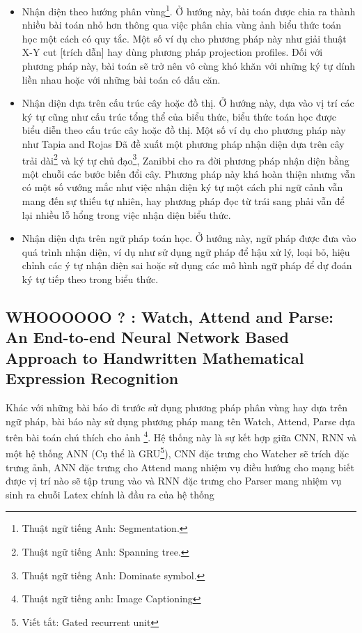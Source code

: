 \documentclass[a4paper,12pt]{article}
\begin{document}
	\begin{itemize}
		\item Nhận diện theo hướng phân vùng\footnote{Thuật ngữ tiếng Anh: Segmentation.}. Ở hướng này, bài toán được chia ra thành nhiều bài toán nhỏ hơn thông qua việc phân chia vùng ảnh biểu thức toán học một cách có quy tắc. Một số ví dụ cho phương pháp này như giải thuật X-Y cut [trích dẫn] hay dùng phương pháp projection profiles. Đối với phương pháp này, bài toán sẽ trở nên vô cùng khó khăn với những ký tự dính liền nhau hoặc với những bài toán có dấu căn.
		
		\item Nhận diện dựa trên cấu trúc cây hoặc đồ thị. Ở hướng này, dựa vào vị trí các ký tự cũng như cấu trúc tổng thể của biểu thức, biểu thức toán học được biểu diễn theo cấu trúc cây hoặc đồ thị. Một số ví dụ cho phương pháp này như Tapia and Rojas Đã đề xuất một phương pháp nhận diện dựa trên cây trải dài\footnote{Thuật ngữ tiếng Anh: Spanning tree.} và ký tự chủ đạo\footnote{Thuật ngữ tiếng Anh: Dominate symbol.}, Zanibbi cho ra đời phương pháp nhận diện bằng một chuỗi các bước biến đổi cây. Phương pháp này khá hoàn thiện nhưng vẫn có một số vướng mắc như việc nhận diện ký tự một cách phi ngữ cảnh vẫn mang đến sự thiếu tự nhiên, hay phương pháp đọc từ trái sang phải vẫn để lại nhiều lỗ hổng trong việc nhận diện biểu thức.
		
		\item Nhận diện dựa trên ngữ pháp toán học. Ở hướng này, ngữ pháp được đưa vào quá trình nhận diện, ví dụ như sử dụng ngữ pháp để hậu xử lý, loại bỏ, hiệu chỉnh các ý tự nhận diện sai hoặc sử dụng các mô hình ngữ pháp để dự đoán ký tự tiếp theo trong biểu thức.
	\end{itemize}
	
	
	\subsection{WHOOOOOO ? \cite{zanibbi} : Watch, Attend and Parse: An End-to-end Neural Network Based Approach to Handwritten Mathematical Expression Recognition} 
	
	Khác với những bài báo đi trước sử dụng phương pháp phân vùng hay dựa trên ngữ pháp, bài báo này sử dụng phương pháp mang tên Watch, Attend, Parse dựa trên bài toán chú thích cho ảnh \footnote{Thuật ngữ tiếng anh: Image Captioning}. Hệ thống này là sự kết hợp giữa CNN, RNN và một hệ thống ANN (Cụ thể là GRU\footnote{Viết tắt: Gated recurrent unit}), CNN đặc trưng cho Watcher sẽ trích đặc trưng ảnh, ANN đặc trưng cho Attend mang nhiệm vụ điều hướng cho mạng biết được vị trí nào sẽ tập trung vào và RNN đặc trưng cho Parser mang nhiệm vụ sinh ra chuỗi Latex chính là đầu ra của hệ thống\\
	
\end{document}
